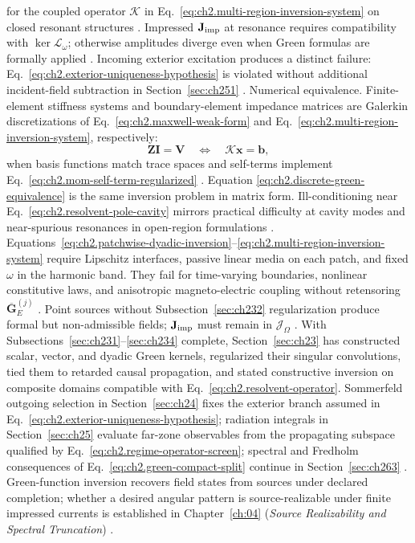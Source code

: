 for the coupled operator \(\mathcal{K}\) in
Eq.~\eqref{eq:ch2.multi-region-inversion-system} on closed resonant structures
\cite{stratton1941}. Impressed \(\mathbf{J}_{\mathrm{imp}}\) at resonance requires compatibility with
\(\ker\mathcal{L}_\omega\); otherwise amplitudes diverge even when Green formulas
are formally applied \cite{harrington2001}. Incoming exterior excitation produces a
distinct failure: Eq.~\eqref{eq:ch2.exterior-uniqueness-hypothesis} is violated
without additional incident-field subtraction in Section~\ref{sec:ch251}
\cite{stratton1941}.
Numerical equivalence. Finite-element stiffness systems and boundary-element impedance matrices are
Galerkin discretizations of Eq.~\eqref{eq:ch2.maxwell-weak-form} and
Eq.~\eqref{eq:ch2.multi-region-inversion-system}, respectively:
\begin{equation}
\label{eq:ch2.discrete-green-equivalence}
\mathbf{Z}\mathbf{I}=\mathbf{V}
\quad\Longleftrightarrow\quad
\mathcal{K}\mathbf{x}=\mathbf{b},
\end{equation}
when basis functions match trace spaces and self-terms implement
Eq.~\eqref{eq:ch2.mom-self-term-regularized} \cite{harrington2001}. Equation
\eqref{eq:ch2.discrete-green-equivalence} is the same inversion problem in matrix form.
Ill-conditioning near
Eq.~\eqref{eq:ch2.resolvent-pole-cavity} mirrors practical difficulty at cavity
modes and near-spurious resonances in open-region formulations
\cite{harrington2001}.
Equations~\eqref{eq:ch2.patchwise-dyadic-inversion}--\eqref{eq:ch2.multi-region-inversion-system}
require Lipschitz interfaces, passive linear media on each patch, and fixed
\(\omega\) in the harmonic band. They fail for time-varying boundaries, nonlinear
constitutive laws, and anisotropic magneto-electric coupling without retensoring
\(\overline{\mathbf{G}}_{E}^{(j)}\) \cite{stratton1941}. Point sources without
Subsection~\ref{sec:ch232} regularization produce formal but non-admissible fields;
\(\mathbf{J}_{\mathrm{imp}}\) must remain in \(\mathcal{J}_\Omega\) \cite{harrington2001}. With Subsections~\ref{sec:ch231}--\ref{sec:ch234} complete, Section~\ref{sec:ch23}
has constructed scalar, vector, and dyadic Green kernels, regularized their
singular convolutions, tied them to retarded causal propagation, and stated
constructive inversion on composite domains compatible with
Eq.~\eqref{eq:ch2.resolvent-operator}. Sommerfeld outgoing selection in
Section~\ref{sec:ch24} fixes the exterior branch assumed in
Eq.~\eqref{eq:ch2.exterior-uniqueness-hypothesis}; radiation integrals in
Section~\ref{sec:ch25} evaluate far-zone observables from the propagating subspace
qualified by Eq.~\eqref{eq:ch2.regime-operator-screen}; spectral and Fredholm
consequences of Eq.~\eqref{eq:ch2.green-compact-split} continue in
Section~\ref{sec:ch263} \cite{stratton1941}. Green-function inversion recovers field
states from sources under declared completion; whether a desired angular pattern is
source-realizable under finite impressed currents is established in Chapter~\ref{ch:04}
(\emph{Source Realizability and Spectral Truncation}) \cite{devaney2004}.
